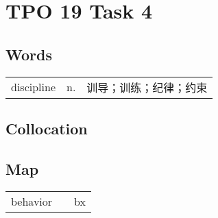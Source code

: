 \section{TPO 19 Task 4}

\subsection{Words}

\begin{tabular}{lll}
    discipline & n. & 训导；训练；纪律；约束 \\
\end{tabular}

\subsection{Collocation}

\subsection{Map}

\begin{tabular}{rc@{\quad$\to$\quad}l}
    behavior &  & bx \\
\end{tabular}

\newpage
